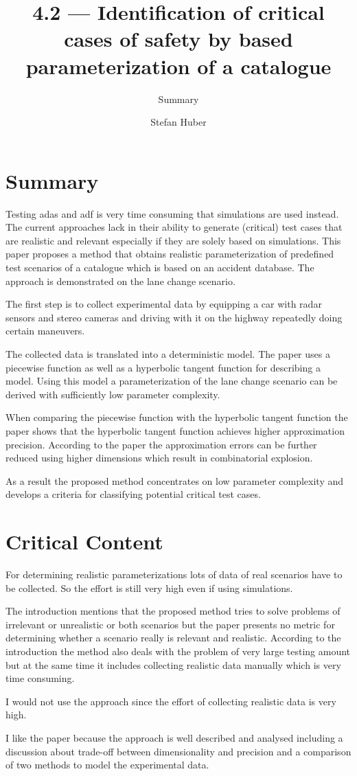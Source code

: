 \documentclass[oneside, notitlepage, twocolumn]{scrartcl}
\title{\LARGE 4.2 --- Identification of critical cases of \glstext{adas} safety by \glstext{fot} based parameterization of a catalogue}
\subtitle{Summary}
\author{Stefan Huber}
\begin{document}
\maketitle

\section{Summary}
Testing \gls{adas} and \gls{adf} is very time consuming that simulations are used instead.
The current approaches lack in their ability to generate (critical) test cases that are realistic and relevant especially if they are solely based on simulations.
This paper proposes a method that obtains realistic parameterization of predefined test scenarios of a catalogue which is based on an accident database.
The approach is demonstrated on the lane change scenario.\par
The first step is to collect experimental data by equipping a car with radar sensors and stereo cameras and driving with it on the highway repeatedly doing certain maneuvers.\par
The collected data is translated into a deterministic model.
The paper uses a piecewise function as well as a hyperbolic tangent function for describing a model.
Using this model a parameterization of the lane change scenario can be derived with sufficiently low parameter complexity.\par
When comparing the piecewise function with the hyperbolic tangent function the paper shows that the hyperbolic tangent function achieves higher approximation precision.
According to the paper the approximation errors can be further reduced using higher dimensions which result in combinatorial explosion.\par
As a result the proposed method concentrates on low parameter complexity and develops a criteria for classifying potential critical test cases.

\section{Critical Content}
For determining realistic parameterizations lots of data of real scenarios have to be collected.
So the effort is still very high even if using simulations.\par
The introduction mentions that the proposed method tries to solve problems of irrelevant or unrealistic or both scenarios but the paper presents no metric for determining whether a scenario really is relevant and realistic.
According to the introduction the method also deals with the problem of very large testing amount but at the same time it includes collecting  realistic data manually which is very time consuming.\par
I would not use the approach since the effort of collecting realistic data is very high.\par
I like the paper because the approach is well described and analysed including a discussion about trade-off between dimensionality and precision and a comparison of two methods to model the experimental data.
\end{document}
